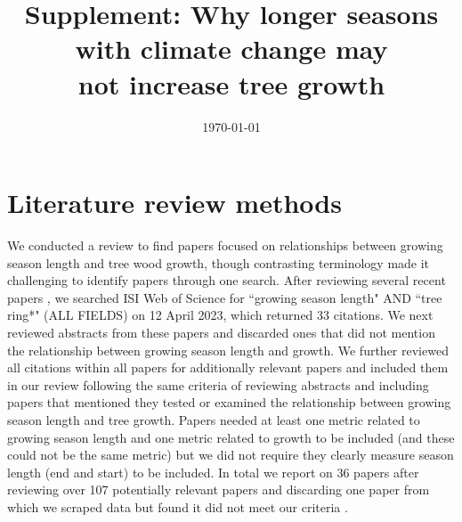 \documentclass[11pt]{article}
\begin{document}
\renewcommand{\refname}{\CHead{}}


\title{Supplement: Why longer seasons with climate change may\\ not increase tree growth}
\date{\today}
\maketitle

\renewcommand{\thetable}{S\arabic{table}}
\renewcommand{\thefigure}{S\arabic{figure}}


\section*{Literature review methods}

We conducted a review to find papers focused on relationships between growing season length and tree wood growth, though contrasting terminology made it challenging to identify papers through one search. After reviewing several recent papers \citep{dow2022warm,zohner2023effect}, we searched ISI Web of Science for ``growing season length" AND ``tree ring*" (ALL FIELDS) on 12 April 2023, which returned 33 citations. We next reviewed abstracts from these papers and discarded ones that did not mention the relationship between growing season length and growth. We further reviewed all citations within all papers for additionally relevant papers and included them in our review following the same criteria of reviewing abstracts and including papers that mentioned they tested or examined the relationship between growing season length and tree growth. Papers needed at least one metric related to growing season length and one metric related to growth to be included (and these could not be the same metric) but we did not require they clearly measure season length (end and start) to be included. In total we report on 36 papers after reviewing over 107 potentially relevant papers and discarding one paper from which we scraped data but found it did not meet our criteria \citep[][because it used tree rings as a metric of both growth and growing season length]{bruening2017}. %
\end{document}
